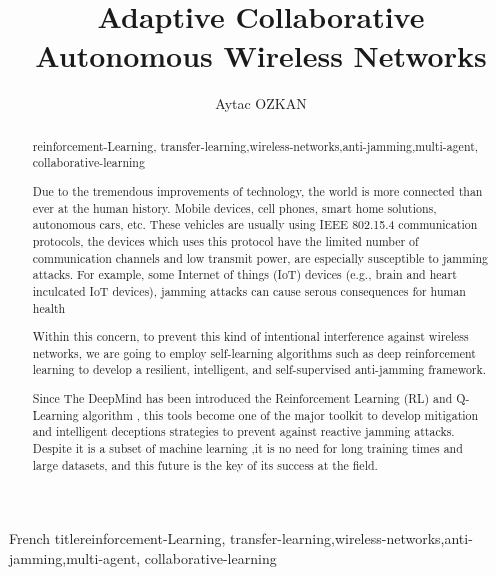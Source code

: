 \documentclass[letterpaper%
, twoside%
, 12pt%
,thesepararticles%
, english%
,creativecommons,hyperref, withAlgo2e%
]{thETS}
\title{Adaptive Collaborative  Autonomous Wireless Networks}
\author{Aytac OZKAN}
\begin{document}

\maketitle

\presentjury

\begin{foreword}

\lipsum[1] %

\end{foreword}



\begin{acknowledgements}

\lipsum[1] %


\end{acknowledgements}



\begin{summary}{French title}{reinforcement-Learning, transfer-learning,wireless-networks,anti-jamming,multi-agent, collaborative-learning}




\end{summary}


\begin{abstract}{reinforcement-Learning, transfer-learning,wireless-networks,anti-jamming,multi-agent, collaborative-learning}

Due to the tremendous improvements of technology, the world is more connected than ever at the human history. Mobile devices, cell phones, smart home solutions, autonomous cars, etc. These vehicles are usually using IEEE 802.15.4 communication protocols, the devices which uses this protocol have the limited number of communication channels and low transmit power, are especially susceptible to jamming attacks. For example, some Internet of things (IoT) devices (e.g., brain and heart inculcated IoT devices), jamming attacks can cause serous consequences for human health

Within this concern, to prevent this kind of intentional interference against wireless networks, we are going to employ self-learning algorithms such as deep reinforcement learning to develop a resilient, intelligent, and self-supervised anti-jamming framework.

 Since The DeepMind has been introduced the Reinforcement Learning (RL) and Q-Learning algorithm \cite{ACM:HasseltetSilver}, this tools become one of the major toolkit to develop mitigation and intelligent deceptions strategies to prevent against reactive jamming attacks. Despite it is a subset of machine learning \cite{Kasturi2020MachineLR},it is no need for long training times and large datasets, and this future is the key of its success at the field. 

\end{abstract}
\end{document}
